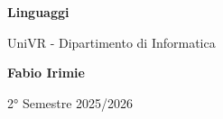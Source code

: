 \begin{titlepage}
	\begin{center}
		\vspace*{1cm}

		\Huge
		\textbf{Linguaggi}

		\vspace{0.5cm}
		\LARGE
		UniVR - Dipartimento di Informatica

		\vspace{1.5cm}

		\textbf{Fabio Irimie}

		\vfill


		\vspace{0.8cm}


		2° Semestre 2025/2026

	\end{center}
\end{titlepage}
